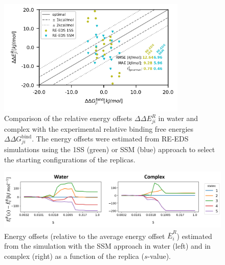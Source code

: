 \begin{figure}[h]
\centering
  \includegraphics[width=0.8\textwidth]{fig/results/ringOpening/paramOptimization/RingClosure_system_Eoff_final_results.png}
\caption{Comparison of the relative energy offsets $\Delta \Delta E^R_{ji}$ in water and complex with the experimental relative binding free energies $\Delta \Delta G^\text{bind}_{ji}$. The energy offsets were estimated from RE-EDS simulations using the 1SS (green) or SSM (blue) approach to select the starting configurations of the replicas.} \label{SIfig:Eoff_experiment_corr_RingOpening}
\end{figure}

\begin{figure}[h]
\centering
  \includegraphics[width=1.0\textwidth]{fig/results/ringOpening/paramOptimization/CHK1_shuffle_eoffs.png}
\caption{Energy offsets (relative to the average energy offset $\overline{E}^R_i$) estimated from the simulation with the SSM approach in water (left) and in complex (right) as a function of the replica ($s$-value).} \label{SIfig:Eoff-perreplica}
\end{figure}


